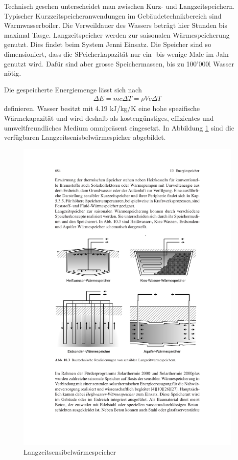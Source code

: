 \documentclass[11pt,a4paper]{scrartcl}
\begin{document}
Technisch gesehen unterscheidet man zwischen Kurz- und Langzeitspeichern.
Typischer Kurzzeitspeicheranwendungen im Gebäudetechnikbereich sind
Warmwasserboiler. Die Verweildauer des Wassers beträgt hier Stunden bis maximal
Tasge. Langzeitspeicher werden zur saisonalen Wärmespeicherung genutzt. Dies
findet beim System Jenni Einsatz. Die Speicher sind so dimensioniert, dass die
SPeicherkapazität nur ein- bis wenige Male im Jahr genutzt wird. Dafür sind aber
grosse Speichermassen, bis zu 100'000l Wasser nötig.

Die gespeicherte Energiemenge lässt sich nach
\begin{align}
\Delta E = mc\Delta T = \rho Vc \Delta T
\end{align}
definieren. Wasser besitzt mit 4.19 kJ/kg/K eine hohe spezifische
Wärmekapazität und wird deshalb als kostengünstiges, effizientes und
umweltfreundliches Medium omnipräsent eingesetzt.
In Abbildung \ref{fig:Langzeitspeicher} sind die verfügbaren
Langzeitsenisbelwärmespicher abgebildet.

\begin{figure}[h]
\begin{center}
\includegraphics[scale=1]{images/langzeitspeicher.pdf}
\caption{Langzeitsensibelwärmespeicher \cite{Wesselak}}
\label{fig:Langzeitspeicher}
\end{center}
\end{figure}
\end{document}
